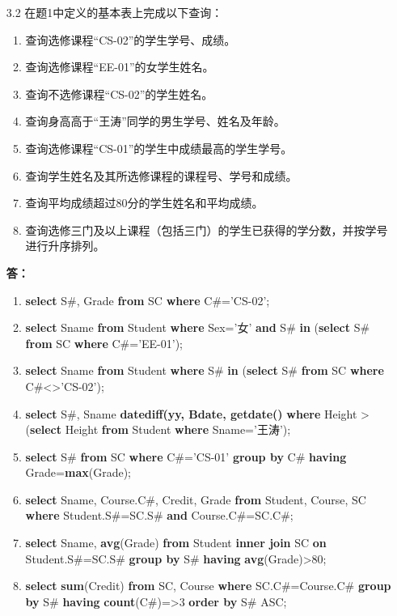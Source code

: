 
\begin{enumerate}
    \item[3.2] 在题1中定义的基本表上完成以下查询：
    \begin{enumerate}[(1)]
        \item 查询选修课程“CS-02”的学生学号、成绩。
        \item 查询选修课程“EE-01”的女学生姓名。
        \item 查询不选修课程“CS-02”的学生姓名。
        \item 查询身高高于“王涛”同学的男生学号、姓名及年龄。
        \item 查询选修课程“CS-01”的学生中成绩最高的学生学号。
        \item 查询学生姓名及其所选修课程的课程号、学号和成绩。
        \item 查询平均成绩超过80分的学生姓名和平均成绩。
        \item 查询选修三门及以上课程（包括三门）的学生已获得的学分数，并按学号进行升序排列。
    \end{enumerate}
    
    \textbf{答：}
    
    \begin{enumerate}[(1)]
        \item \textbf{select} S\#, Grade \textbf{from} SC \textbf{where} C\#='CS-02';
        \item \textbf{select} Sname \textbf{from} Student \textbf{where} Sex='女' \textbf{and} S\# \textbf{in} (\textbf{select} S\# \textbf{from} SC \textbf{where} C\#='EE-01');
        \item \textbf{select} Sname \textbf{from} Student \textbf{where} S\# \textbf{in} (\textbf{select} S\# \textbf{from} SC \textbf{where} C\#<>'CS-02');
        \item \textbf{select} S\#, Sname \textbf{datediff(yy, Bdate, getdate()} \textbf{where} Height > (\textbf{select} Height \textbf{from} Student \textbf{where} Sname='王涛');
        \item \textbf{select} S\# \textbf{from} SC \textbf{where} C\#='CS-01' \textbf{group by} C\# \textbf{having} Grade=\textbf{max}(Grade);
        \item \textbf{select} Sname, Course.C\#, Credit, Grade \textbf{from} Student, Course, SC \textbf{where} Student.S\#=SC.S\# \textbf{and} Course.C\#=SC.C\#;
        \item \textbf{select} Sname, \textbf{avg}(Grade) \textbf{from} Student \textbf{inner join} SC \textbf{on} Student.S\#=SC.S\# \textbf{group by} S\# \textbf{having} \textbf{avg}(Grade)>80;
        \item \textbf{select} \textbf{sum}(Credit) \textbf{from} SC, Course \textbf{where} SC.C\#=Course.C\# \textbf{group by} S\# \textbf{having} \textbf{count}(C\#)=>3 \textbf{order by} S\# ASC;
    \end{enumerate}


\end{enumerate}
